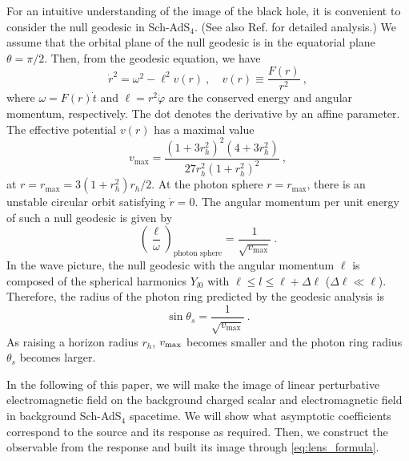 \documentclass[a4paper,11pt]{article}
\begin{document}
    For an intuitive understanding of the image of the  black hole, it is convenient to consider the null geodesic in Sch-AdS$_4$. 
    (See also Ref.\cite{Hashimoto:2018okj} for detailed analysis.)
    We assume that the orbital plane of the null geodesic is in the equatorial plane $\theta=\pi/2$.
    Then, from the geodesic equation, we have
    \begin{equation}
        \dot{r}^2=\omega^2-\ell^2 v(r)\ ,\quad v(r)\equiv \frac{F(r)}{r^2}\ ,
        \label{geodesic}
    \end{equation}
    where $\omega=F(r)\dot{t}$ and $\ell=r^2\dot{\varphi}$ are the conserved energy and angular momentum, respectively. 
    The dot denotes the derivative by an affine parameter.
    The effective potential $v(r)$ has a maximal value
    \begin{equation}
        v_\text{max}=\frac{(1+3r_h^2)^2(4+3r_h^2)}{27r_h^2(1+r_h^2)^2}\ ,
        \label{vmax}
    \end{equation}
    at $r=r_\textrm{max}=3(1+r_h^2)r_h/2$. 
    At the photon sphere $r=r_\textrm{max}$, there is an unstable circular orbit satisfying $\dot{r}=0$.
    The angular momentum per unit energy of such a null geodesic is given by
    \begin{equation}
        \left(\frac{\ell}{\omega}\right)_\textrm{photon sphere} = \frac{1}{\sqrt{v_\textrm{max}}}\ .
        \label{lphoton}
    \end{equation}
    In the wave picture, the null geodesic with the angular momentum $\ell$ is composed of the spherical harmonics $Y_{l0}$ with $\ell\leq l \leq \ell +\Delta \ell$ ($\Delta \ell \ll \ell$).
    Therefore, the radius of the photon ring predicted by the geodesic analysis is 
    \begin{equation}
        \sin \theta_s = \frac{1}{\sqrt{v_\textrm{max}}}\ .
        \label{Estnradius}
    \end{equation}
	As raising a horizon radius $r_h$, $v_{\rm{max}}$ becomes smaller and the photon ring radius $\theta_s$ becomes larger.

    In the following of this paper, we will make the image of linear perturbative electromagnetic field on the background charged scalar and electromagnetic field in background Sch-AdS$_4$ spacetime. 
    We will show what asymptotic coefficients correspond to the source and its response as required. Then, we construct the observable from the response and built its image through \eqref{eq:lens_formula}.
\end{document}
